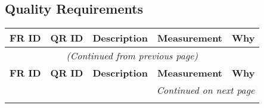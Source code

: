 \subsection{Quality Requirements}
\usepackage{longtable}
\usepackage{xcolor, colortbl}



\renewcommand{\arraystretch}{1.3} %

\begin{longtable}{|c|c|p{4.5cm}|p{3.5cm}|p{3.5cm}|}
    \hline
    \rowcolor{lightgray} \textbf{FR ID} & \textbf{QR ID} & \textbf{Description} & \textbf{Measurement} & \textbf{Why} \\
    \hline
    \endfirsthead

    \multicolumn{5}{c}{\textit{(Continued from previous page)}} \\
    \hline
    \rowcolor{lightgray} \textbf{FR ID} & \textbf{QR ID} & \textbf{Description} & \textbf{Measurement} & \textbf{Why} \\
    \hline
    \endhead

    \hline
    \multicolumn{5}{r}{\textit{Continued on next page}} \\
    \endfoot

    \hline
    \endlastfoot


\end{longtable}
